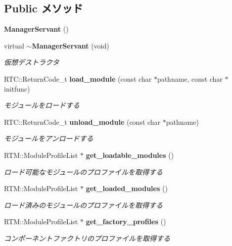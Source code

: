 \subsection*{Public メソッド}
\begin{DoxyCompactItemize}
\item 
{\bf ManagerServant} ()
\item 
virtual {\bf $\sim$ManagerServant} (void)
\begin{DoxyCompactList}\small\item\em 仮想デストラクタ \item\end{DoxyCompactList}\item 
RTC::ReturnCode\_\-t {\bf load\_\-module} (const char $\ast$pathname, const char $\ast$initfunc)
\begin{DoxyCompactList}\small\item\em モジュールをロードする \item\end{DoxyCompactList}\item 
RTC::ReturnCode\_\-t {\bf unload\_\-module} (const char $\ast$pathname)
\begin{DoxyCompactList}\small\item\em モジュールをアンロードする \item\end{DoxyCompactList}\item 
RTM::ModuleProfileList $\ast$ {\bf get\_\-loadable\_\-modules} ()
\begin{DoxyCompactList}\small\item\em ロード可能なモジュールのプロファイルを取得する \item\end{DoxyCompactList}\item 
RTM::ModuleProfileList $\ast$ {\bf get\_\-loaded\_\-modules} ()
\begin{DoxyCompactList}\small\item\em ロード済みのモジュールのプロファイルを取得する \item\end{DoxyCompactList}\item 
RTM::ModuleProfileList $\ast$ {\bf get\_\-factory\_\-profiles} ()
\begin{DoxyCompactList}\small\item\em コンポーネントファクトリのプロファイルを取得する \item\end{DoxyCompactList}\item 

\end{DoxyCompactItemize}
